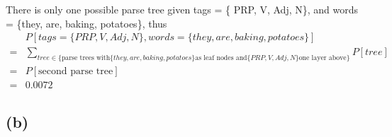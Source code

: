 \documentclass[twoside,11pt]{homework}
\begin{document}
\begin{solution}
  There is only one possible parse tree given
  tags = \{ PRP, V, Adj, N\},
  and words = \{they, are, baking, potatoes\}, thus
  \[
    \begin{aligned}
        &P[tags = \{ PRP, V, Adj, N\}, words = \{they, are, baking, potatoes\}]\\
      = &\sum_{tree \in \{\text{parse trees with} \{they, are, baking, potatoes\} \text{as leaf nodes and} \{ PRP, V, Adj, N\} \text{one layer above}\}} P[tree]\\
      = &P[\text{second parse tree}]\\
      = &0.0072
    \end{aligned}
  \]
\end{solution}

\subsection*{(b)}
\end{document}
